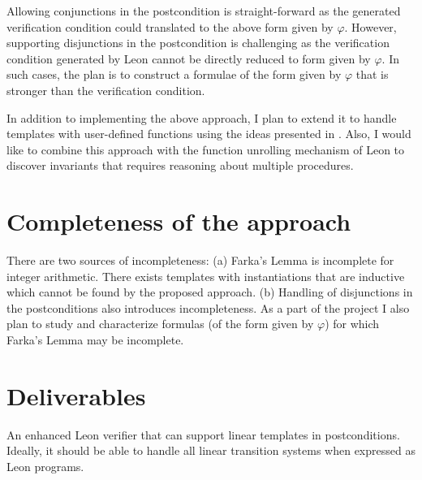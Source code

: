 \documentclass[a4paper,10pt]{article}
\begin{document}
Allowing conjunctions in the postcondition is straight-forward as the generated  verification condition could translated to the above form given by $\varphi$. However, supporting disjunctions in the postcondition is challenging as the verification condition generated by Leon cannot be directly reduced to form given by $\varphi$. In such cases, the plan is to construct a formulae of the form given by $\varphi$ that is stronger than the verification condition.

In addition to implementing the above approach, I plan to extend it to handle templates with user-defined functions using the ideas presented in \cite{dirk:VMCAI07}. Also, I would like to combine this approach with the function unrolling mechanism of Leon to discover invariants that requires reasoning about multiple procedures.
 
\section{Completeness of the approach}

There are two sources of incompleteness: (a) Farka's Lemma is incomplete for integer arithmetic. There exists templates with instantiations that are  inductive which cannot be found by the proposed approach. (b) Handling of disjunctions in the postconditions also introduces incompleteness.
As a part of the project I also plan to study and characterize formulas (of the form given by $\varphi$) for which Farka's Lemma may be incomplete.

\section{Deliverables}

An enhanced Leon verifier that can support linear templates in postconditions. Ideally, it should be able to handle all linear transition systems when expressed as Leon programs.



\end{document}
